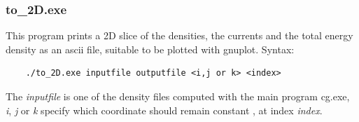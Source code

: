 \documentclass[12pt, a4paper]{article}
\begin{document}
\subsubsection{to\_2D.exe}
This program prints a 2D slice of the densities, the currents and the total energy density as an ascii file, suitable to be plotted with gnuplot. 
Syntax:
\begin{footnotesize}
	\begin{verbatim}
	./to_2D.exe inputfile outputfile <i,j or k> <index>
	\end{verbatim}
\end{footnotesize}
The \emph{inputfile} is one of the density files computed with the main program cg.exe, \emph{i}, \emph{j} or \emph{k} specify which coordinate should remain constant , at index \emph{index}.\\
\end{document}

